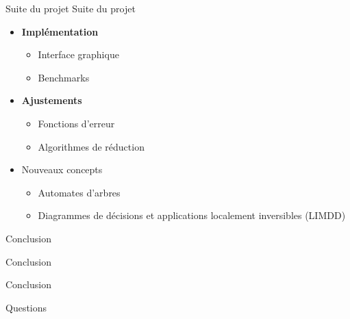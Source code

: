 \documentclass[french, 12pt]{beamer}
\begin{document}


\begin{frame}{Suite du projet}
Suite du projet
\begin{itemize}
    \item \textbf{Implémentation}
    \begin{itemize}
        \item Interface graphique
        \item Benchmarks
    \end{itemize}
    \item \textbf{Ajustements}
    \begin{itemize}
        \item Fonctions d'erreur
        \item Algorithmes de réduction
    \end{itemize}
    \item Nouveaux concepts
    \begin{itemize}
        \item Automates d'arbres
        \item Diagrammes de décisions et applications localement inversibles (LIMDD)
    \end{itemize}
\end{itemize}
\end{frame}



\begin{frame}{Conclusion}
\begin{center}
    \huge{Conclusion}
\end{center}
\end{frame}

\begin{frame}{Conclusion}
    \begin{center}
        \huge{Questions}
    \end{center}
\end{frame}


\end{document}
